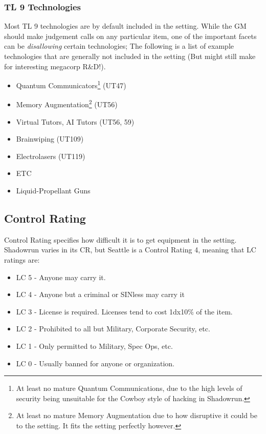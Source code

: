 \begin{multicols*}{3}
	\subsubsection{TL 9 Technologies}
	
	Most TL 9 technologies are by default included in the setting. While the GM should make judgement calls on any particular item, one of the important facets can be \textit{disallowing} certain technologies; The following is a list of example technologies that are generally not included in the setting (But might still make for interesting megacorp R\&D!).
	
	\begin{itemize}
		\itemsep 0pt
		\item Quantum Communicators\footnote{At least no mature Quantum Communications, due to the high levels of security being unsuitable for the Cowboy style of hacking in Shadowrun.} (UT47)
		\item Memory Augmentation\footnote{At least no mature Memory Augmentation due to how disruptive it could be to the setting. It fits the setting perfectly however.} (UT56)
		\item Virtual Tutors, AI Tutors (UT56, 59)
		\item Brainwiping (UT109)
		\item Electrolasers (UT119)
		\item ETC
		\item Liquid-Propellant Guns
	\end{itemize}
	
	\subsection{Control Rating}
	
	Control Rating specifies how difficult it is to get equipment in the setting. Shadowrun varies in its CR, but Seattle is a Control Rating 4, meaning that LC ratings are:
	
	\begin{itemize}
		\itemsep 0pt
		\item LC 5 - Anyone may carry it.
		\item LC 4 - Anyone but a criminal or SINless may carry it
		\item LC 3 - License is required. Licenses tend to cost 1dx10\% of the item.
		\item LC 2 - Prohibited to all but Military, Corporate Security, etc.
		\item LC 1 - Only permitted to Military, Spec Ops, etc.
		\item LC 0 - Usually banned for anyone or organization.
	\end{itemize}
	

\end{multicols*}
